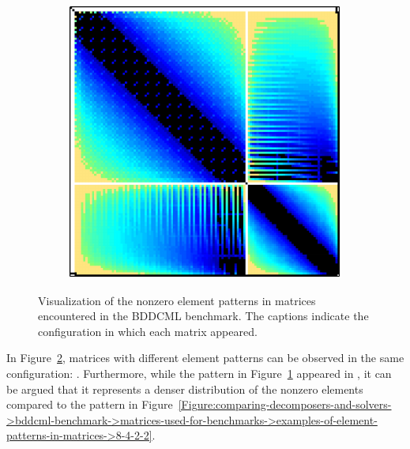 \begin{figure}[ht!]
\begin{subfigure}[b]{0.48\textwidth}
		\includegraphics[width=\textwidth]{images/ch03/input-matrices/bddcml-benchmark/poc-32_4_2.pdf}
		\caption{}
		\label{Figure:comparing-decomposers-and-solvers->bddcml-benchmark->matrices-used-for-benchmarks->examples-of-element-patterns-in-matrices->32-4-2}
	\end{subfigure}
	
	\caption{Visualization of the nonzero element patterns in matrices encountered in the BDDCML benchmark.
		The captions indicate the configuration in which each matrix appeared.
	}
	\label{Figure:comparing-decomposers-and-solvers->bddcml-benchmark->matrices-used-for-benchmarks->examples-of-element-patterns-in-matrices}
\end{figure}

In Figure~\ref{Figure:comparing-decomposers-and-solvers->bddcml-benchmark->matrices-used-for-benchmarks->examples-of-element-patterns-in-matrices}, matrices with different element patterns can be observed in the same configuration: .
Furthermore, while the pattern in Figure~\ref{Figure:comparing-decomposers-and-solvers->bddcml-benchmark->matrices-used-for-benchmarks->examples-of-element-patterns-in-matrices->32-4-2} appeared in , it can be argued that it represents a denser distribution of the nonzero elements compared to the pattern in Figure~\ref{Figure:comparing-decomposers-and-solvers->bddcml-benchmark->matrices-used-for-benchmarks->examples-of-element-patterns-in-matrices->8-4-2-2}.



